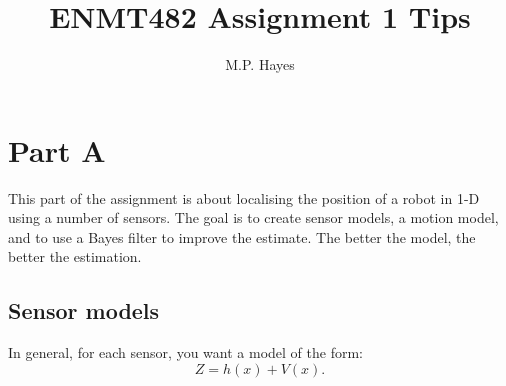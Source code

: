 \documentclass[a4paper, 12]{article}
\title{ENMT482 Assignment 1 Tips}
\author{M.P. Hayes}
\date{}
\begin{document}
\maketitle


\section{Part A}

This part of the assignment is about localising the position of a
robot in 1-D using a number of sensors.  The goal is to create sensor
models, a motion model, and to use a Bayes filter to improve the
estimate.  The better the model, the better the estimation.


\subsection{Sensor models}

In general, for each sensor, you want a model of the form:
%
\begin{equation}
  Z = h(x) + V(x).
\end{equation}
\end{document}
